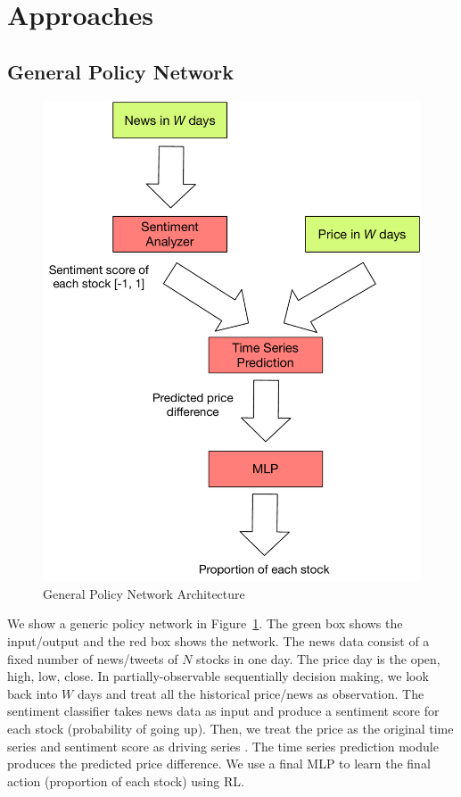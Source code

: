 \documentclass[11pt,a4paper]{article}
\begin{document}
\section{Approaches}
\subsection{General Policy Network}
\begin{figure}
  \centering
  \includegraphics[width=\linewidth]{policy}
  \caption{General Policy Network Architecture}
  \label{fig:policy}
\end{figure}
We show a generic policy network in Figure~\ref{fig:policy}. The green box shows the input/output and the red box shows the network. The news data consist of a fixed number of news/tweets of $N$ stocks in one day. The price day is the open, high, low, close. 
In partially-observable sequentially decision making, we look back into $W$ days and treat all the historical price/news as observation.
The sentiment classifier takes news data as input and produce a sentiment score for each stock (probability of going up). Then, we treat the price as the original time series and sentiment score as driving series \cite{dual_attention}. The time series prediction module produces the predicted price difference. We use a final MLP to learn the final action (proportion of each stock) using RL.
\end{document}
